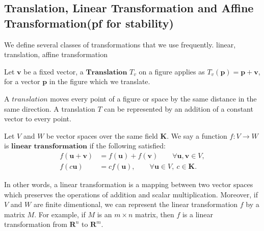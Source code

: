    \subsection{Translation, Linear Transformation and Affine Transformation(pf for stability)}
      
      We define several classes of transformations that we use frequently.
      linear, translation, affine transformation\\
      
      \begin{definition*}
         Let $\textbf{v}$ be a fixed vector, a $\textbf{Translation}$ ${T}_v$ on a figure applies as ${T}_v (\textbf{p}) = \textbf{p} + \textbf{v}$, for a vector $\textbf{p}$ in the figure which we translate.
      \end{definition*}
      A $\textit{translation}$ moves every point of a figure or space by the same distance in the same direction. A translation ${T}$ can be represented by an addition of a constant vector to every point.\\


      \begin{definition*}
      Let ${V}$ and ${W}$ be vector spaces over the same field $\textbf{K}$. We say a function $\mathit{f}: {V} \rightarrow {W}$ is $\textbf{linear transformation}$ if the following satisfied:\\
      \begin{align*}
      \mathit{f}(\textbf{u} + \textbf{v}) &= \mathit{f}(\textbf{u}) + \mathit{f}(\textbf{v}) \qquad \forall \textbf{u}, \textbf{v} \in{V},\\
      \mathit{f}(c\textbf{u}) &= c\mathit{f}(\textbf{u}), \qquad \forall \textbf{u} \in{V}, ~c\in\textbf{K}.
      \end{align*}
      \end{definition*}
      In other words, a linear transformation is a mapping between two vector spaces which preserves the operations of addition and scalar multiplication. Moreover, if ${V}$ and ${W}$ are finite dimentional, we can represent the linear transformation ${f}$ by a matrix ${M}$. For example, if ${M}$ is an ${m} \times {n}$ matrix, then ${f}$ is a linear transformation from $\mathbf{R}^n$ to $\mathbf{R}^m$. \\


